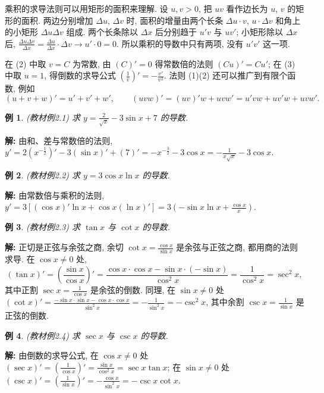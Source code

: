\documentclass[UTF8,openany]{ctexbook}
\theoremstyle{chinesetextbook}
\newtheorem{example}{例}[section]
\newenvironment{cnsolution}{\par\indent\textbf{解:} \ignorespaces}{\par}
\begin{document}
乘积的求导法则可以用矩形的面积来理解. 设 $u,v>0$, 把 $uv$ 看作边长为 $u$, $v$ 的矩形的面积. 两边分别增加 $\Delta u$, $\Delta v$ 时, 面积的增量由两个长条 $\Delta u\cdot v$, $u\cdot\Delta v$ 和角上的小矩形 $\Delta u\Delta v$ 组成. 两个长条除以 $\Delta x$ 后分别趋于 $u'v$ 与 $uv'$; 小矩形除以 $\Delta x$ 后, $\displaystyle\frac{\Delta u\Delta v}{\Delta x}=\frac{\Delta u}{\Delta x}\cdot\Delta v\to u'\cdot0=0$. 所以乘积的导数中只有两项, 没有 $u'v'$ 这一项.

在 (2) 中取 $v=C$ 为常数, 由 $(C)'=0$ 得常数倍的法则 $(Cu)'=Cu'$; 在 (3) 中取 $u=1$, 得倒数的求导公式 $\displaystyle\left(\frac1v\right)'=-\frac{v'}{v^2}$. 法则 (1)(2) 还可以推广到有限个函数, 例如
\[
(u+v+w)'=u'+v'+w',\qquad(uvw)'=(uv)'w+uvw'=u'vw+uv'w+uvw'.
\]
\begin{example}\label{ex:c2-2-1}
\textnormal{(教材例2.1)} 求 $\displaystyle y=\frac2{\sqrt x}-3\sin x+7$ 的导数.
\end{example}
\begin{cnsolution}
由和、差与常数倍的法则, $\displaystyle y'=2\left(x^{-\frac12}\right)'-3(\sin x)'+(7)'=-x^{-\frac32}-3\cos x=-\frac1{x\sqrt x}-3\cos x$.
\end{cnsolution}
\begin{example}\label{ex:c2-2-2}
\textnormal{(教材例2.2)} 求 $y=3\cos x\ln x$ 的导数.
\end{example}
\begin{cnsolution}
由常数倍与乘积的法则, $\displaystyle y'=3\left[(\cos x)'\ln x+\cos x(\ln x)'\right]=3\left(-\sin x\ln x+\frac{\cos x}x\right)$.
\end{cnsolution}
\begin{example}\label{ex:c2-2-3}
\textnormal{(教材例2.3)} 求 $\tan x$ 与 $\cot x$ 的导数.
\end{example}
\begin{cnsolution}
正切是正弦与余弦之商, 余切 $\displaystyle\cot x=\frac{\cos x}{\sin x}$ 是余弦与正弦之商, 都用商的法则求导. 在 $\cos x\ne0$ 处,
\[
(\tan x)'=\left(\frac{\sin x}{\cos x}\right)'=\frac{\cos x\cdot\cos x-\sin x\cdot(-\sin x)}{\cos^2x}=\frac1{\cos^2x}=\sec^2x,
\]
其中正割 $\displaystyle\sec x=\frac1{\cos x}$ 是余弦的倒数. 同理, 在 $\sin x\ne0$ 处 $\displaystyle(\cot x)'=\frac{-\sin x\cdot\sin x-\cos x\cdot\cos x}{\sin^2x}=-\frac1{\sin^2x}=-\csc^2x$, 其中余割 $\displaystyle\csc x=\frac1{\sin x}$ 是正弦的倒数.
\end{cnsolution}
\begin{example}\label{ex:c2-2-4}
\textnormal{(教材例2.4)} 求 $\sec x$ 与 $\csc x$ 的导数.
\end{example}
\begin{cnsolution}
由倒数的求导公式, 在 $\cos x\ne0$ 处 $\displaystyle(\sec x)'=\left(\frac1{\cos x}\right)'=\frac{\sin x}{\cos^2x}=\sec x\tan x$; 在 $\sin x\ne0$ 处 $\displaystyle(\csc x)'=\left(\frac1{\sin x}\right)'=-\frac{\cos x}{\sin^2x}=-\csc x\cot x$.
\end{cnsolution}
\end{document}
